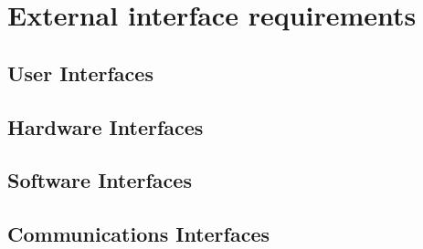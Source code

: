 
\section{External interface requirements}

\subsection{User Interfaces}
\subsection{Hardware Interfaces}
\subsection{Software Interfaces}
\subsection{Communications Interfaces}

